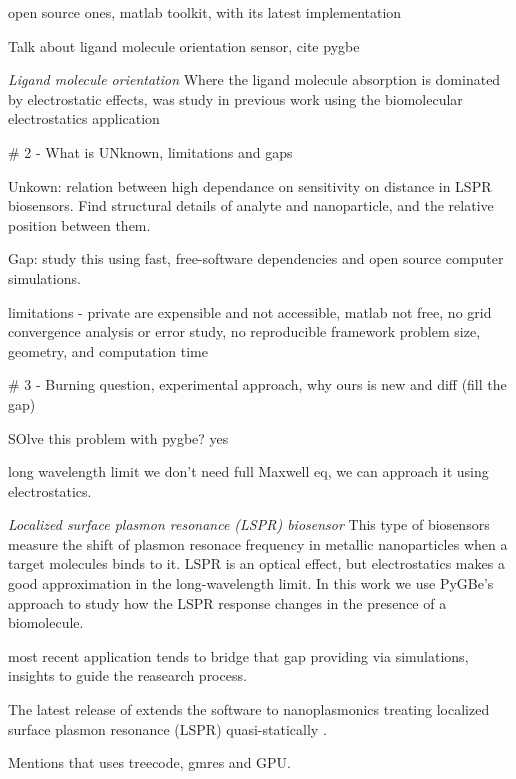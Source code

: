 
open source ones, matlab toolkit, with its latest implementation

Talk about ligand molecule orientation sensor, cite pygbe

\item{\textit{Ligand molecule orientation} Where the ligand molecule absorption is dominated
by electrostatic effects, was study in previous work \cite{CooperClementiBarba2015}
using the biomolecular electrostatics \pygbe application \cite{CooperETal2016}}


# 2 - What is UNknown, limitations and gaps

Unkown: relation between high dependance on sensitivity on distance in LSPR biosensors.
Find structural details of analyte and nanoparticle, and the relative position between them.

Gap: study this using fast, free-software dependencies and open source computer
simulations. 

limitations - private are expensible and not accessible, 
              matlab not free, 
              no grid convergence analysis or error study, 
              no reproducible framework 
              problem size, geometry, and computation time




# 3 - Burning question, experimental approach, why ours is new and diff (fill the gap)

SOlve this problem with pygbe? yes

long wavelength limit we don't need full Maxwell eq, we can approach it using
electrostatics.

\item{\textit{Localized surface plasmon resonance (LSPR) biosensor} This type
of biosensors measure the shift of plasmon resonace frequency in metallic nanoparticles
when a target molecules binds to it. LSPR is an optical effect, but electrostatics 
makes a good approximation in the long-wavelength limit. In this work we use
PyGBe's approach to study how the LSPR response changes in the presence of a 
biomolecule.}


\pygbe most recent 
application \cite{ClementiETal2017} tends to bridge that gap providing via
simulations, insights to guide the reasearch process. 

The latest release of \pygbe
extends the software to nanoplasmonics treating localized surface plasmon 
resonance (LSPR) quasi-statically \cite{MayergoyzZhang2007}.

Mentions that uses treecode, gmres and GPU. 

